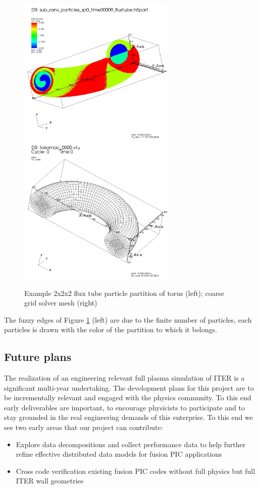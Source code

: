 \documentclass[review]{siamart}
\begin{document}
\begin{figure}[h!]
   \centering
   \includegraphics[width=75mm]{half_grid.jpeg} 
    \includegraphics[width=75mm]{half_grid_mesh.jpeg} 
   \caption{Example 2x2x2 flux tube particle partition of torus (left); coarse grid solver mesh (right)}
   \label{fig:cross}
\end{figure}
The fuzzy edges of Figure \ref{fig:cross} (left) are due to the finite number of particles, each particles is drawn with the color of the partition to which it belongs.

\subsection{Future plans}

The realization of an engineering relevant full plasma simulation of ITER is a significant multi-year undertaking.
The development plans for this project are to be incrementally relevant and engaged with the physics community.
To this end early deliverables are important, to encourage physicists to participate and to stay grounded in the real engineering demands of this enterprise.
To this end we see two early areas that our project can contribute:
\begin{itemize}
\item Explore data decompositions and collect performance data to help further refine effective distributed data models for fusion PIC applications
\item Cross code verification existing fusion PIC codes without full physics but full ITER wall geometries
\end{itemize}
 




 
\end{document}
